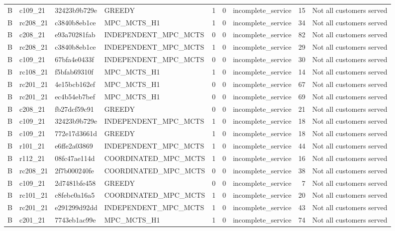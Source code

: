 \begin{table}
{\begin{tabular}{llllrrlrl}
B & c109\_21 & 32423b9b729e & GREEDY & 1 & 0 & incomplete\_service & 15 & Not all customers served \\
B & rc208\_21 & c3840b8eb1ce & MPC\_MCTS\_H1 & 1 & 0 & incomplete\_service & 34 & Not all customers served \\
B & c208\_21 & e93a70281fab & INDEPENDENT\_MPC\_MCTS & 0 & 0 & incomplete\_service & 82 & Not all customers served \\
B & rc208\_21 & c3840b8eb1ce & INDEPENDENT\_MPC\_MCTS & 1 & 0 & incomplete\_service & 29 & Not all customers served \\
B & c109\_21 & 67bfa4e0433f & INDEPENDENT\_MPC\_MCTS & 0 & 0 & incomplete\_service & 30 & Not all customers served \\
B & rc108\_21 & f5bfab69310f & MPC\_MCTS\_H1 & 1 & 0 & incomplete\_service & 14 & Not all customers served \\
B & rc201\_21 & 4e15bcb162ef & MPC\_MCTS\_H1 & 0 & 0 & incomplete\_service & 67 & Not all customers served \\
B & rc201\_21 & ec4b54eb7bef & MPC\_MCTS\_H1 & 0 & 0 & incomplete\_service & 69 & Not all customers served \\
B & c208\_21 & fb27dcf59c91 & GREEDY & 0 & 0 & incomplete\_service & 21 & Not all customers served \\
B & c109\_21 & 32423b9b729e & INDEPENDENT\_MPC\_MCTS & 1 & 0 & incomplete\_service & 18 & Not all customers served \\
B & c109\_21 & 772e17d3661d & GREEDY & 1 & 0 & incomplete\_service & 18 & Not all customers served \\
B & r101\_21 & e6ffe2a03869 & INDEPENDENT\_MPC\_MCTS & 1 & 0 & incomplete\_service & 44 & Not all customers served \\
B & r112\_21 & 08fc47ae114d & COORDINATED\_MPC\_MCTS & 1 & 0 & incomplete\_service & 16 & Not all customers served \\
B & rc208\_21 & 2f7b000240fe & COORDINATED\_MPC\_MCTS & 0 & 0 & incomplete\_service & 38 & Not all customers served \\
B & c109\_21 & 2d7481bfe458 & GREEDY & 0 & 0 & incomplete\_service & 7 & Not all customers served \\
B & rc101\_21 & c8febc0a16a5 & COORDINATED\_MPC\_MCTS & 1 & 0 & incomplete\_service & 20 & Not all customers served \\
B & rc201\_21 & e291299d92dd & INDEPENDENT\_MPC\_MCTS & 1 & 0 & incomplete\_service & 43 & Not all customers served \\
B & c201\_21 & 7743eb1ac99e & MPC\_MCTS\_H1 & 1 & 0 & incomplete\_service & 74 & Not all customers served \\

\end{tabular}}
\end{table}
